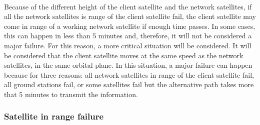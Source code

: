 \documentclass[12pt,a4paper]{report}
\begin{document}
\paragraph{}Because of the different height of the client satellite and the network satellites, if all the network satellites is range of the client satellite fail, the client satellite may come in range of a working network satellite if enough time passes. In some cases, this can happen in less than 5 minutes and, therefore, it will not be considered a major failure. For this reason, a more critical situation will be considered. It will be considered that the client satellite moves at the same speed as the network satellites, in the same orbital plane. In this situation, a major failure can happen because for three reasons: all network satellites in range of the client satellite fail, all ground stations fail, or some satellites fail but the alternative path takes more that 5 minutes to transmit the information.

\subsubsection{Satellite in range failure}
\end{document}
